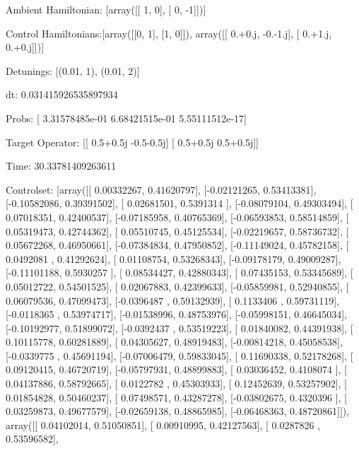 \documentclass{article}
\begin{document}
    

\newpage

Ambient Hamiltonian: [array([[ 1,  0],
       [ 0, -1]])]

Control Hamiltonians:[array([[0, 1],
       [1, 0]]), array([[ 0.+0.j, -0.-1.j],
       [ 0.+1.j,  0.+0.j]])]

Detunings: [(0.01, 1), (0.01, 2)]

 dt: 0.031415926535897934

Probs: [  3.31578485e-01   6.68421515e-01   5.55111512e-17]

Target Operator: [[ 0.5+0.5j -0.5-0.5j]
 [ 0.5+0.5j  0.5+0.5j]]

Time: 30.33781409263611

Controlset: [array([[ 0.00332267,  0.41620797],
       [-0.02121265,  0.53413381],
       [-0.10582086,  0.39391502],
       [ 0.02681501,  0.5391314 ],
       [-0.08079104,  0.49303494],
       [ 0.07018351,  0.42400537],
       [-0.07185958,  0.40765369],
       [-0.06593853,  0.58514859],
       [ 0.05319473,  0.42744362],
       [ 0.05510745,  0.45125534],
       [-0.02219657,  0.58736732],
       [ 0.05672268,  0.46950661],
       [-0.07384834,  0.47950852],
       [-0.11149024,  0.45782158],
       [ 0.0492081 ,  0.41292624],
       [ 0.01108754,  0.53268343],
       [-0.09178179,  0.49009287],
       [-0.11101188,  0.5930257 ],
       [ 0.08534427,  0.42880343],
       [ 0.07435153,  0.53345689],
       [ 0.05012722,  0.54501525],
       [ 0.02067883,  0.42399633],
       [-0.05859981,  0.52940855],
       [ 0.06079536,  0.47099473],
       [-0.0396487 ,  0.59132939],
       [ 0.1133406 ,  0.59731119],
       [-0.0118365 ,  0.53974717],
       [-0.01538996,  0.48753976],
       [-0.05998151,  0.46645034],
       [-0.10192977,  0.51899072],
       [-0.0392437 ,  0.53519223],
       [ 0.01840082,  0.44391938],
       [ 0.10115778,  0.60281889],
       [ 0.04305627,  0.48919483],
       [-0.00814218,  0.45058538],
       [-0.0339775 ,  0.45691194],
       [-0.07006479,  0.59833045],
       [ 0.11690338,  0.52178268],
       [ 0.09120415,  0.46720719],
       [-0.05797931,  0.48899883],
       [ 0.03036452,  0.4108074 ],
       [ 0.04137886,  0.58792665],
       [ 0.0122782 ,  0.45303933],
       [ 0.12452639,  0.53257902],
       [ 0.01854828,  0.50460237],
       [ 0.07498571,  0.43287278],
       [-0.03802675,  0.4320396 ],
       [ 0.03259873,  0.49677579],
       [-0.02659138,  0.48865985],
       [-0.06468363,  0.48720861]]), array([[ 0.04102014,  0.51050851],
       [ 0.00910995,  0.42127563],
       [ 0.0287826 ,  0.53596582],
\end{document}
